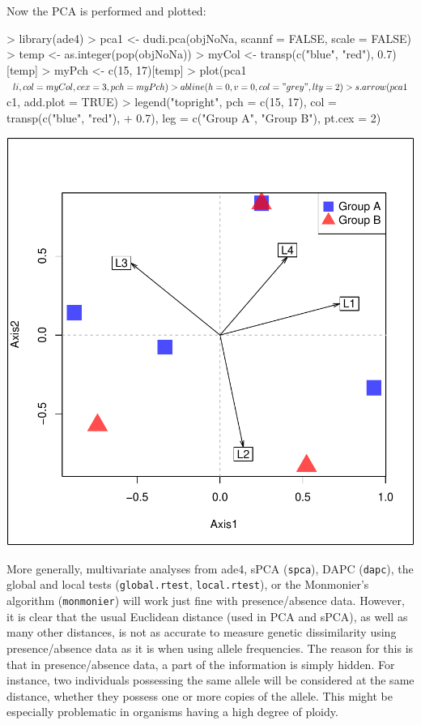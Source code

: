 \documentclass{article}
\begin{document}
\noindent Now the PCA is performed and plotted:
\begin{Schunk}
\begin{Sinput}
> library(ade4)
> pca1 <- dudi.pca(objNoNa, scannf = FALSE, scale = FALSE)
> temp <- as.integer(pop(objNoNa))
> myCol <- transp(c("blue", "red"), 0.7)[temp]
> myPch <- c(15, 17)[temp]
> plot(pca1$li, col = myCol, cex = 3, pch = myPch)
> abline(h = 0, v = 0, col = "grey", lty = 2)
> s.arrow(pca1$c1, add.plot = TRUE)
> legend("topright", pch = c(15, 17), col = transp(c("blue", "red"), 
+     0.7), leg = c("Group A", "Group B"), pt.cex = 2)
\end{Sinput}
\end{Schunk}
\includegraphics{figs/base-pcaaflp}

\noindent More generally, multivariate analyses from ade4, sPCA (\texttt{spca}), DAPC
(\texttt{dapc}), the global and local tests (\texttt{global.rtest}, \texttt{local.rtest}), or
the Monmonier's algorithm (\texttt{monmonier}) will work just fine
with presence/absence data.
However, it is clear that the usual Euclidean distance (used in PCA
and sPCA), as well as many other distances, is not as accurate to measure genetic dissimilarity using
presence/absence data as it is when using allele frequencies.
The reason for this is that in presence/absence data, a part of the
information is simply hidden.
For instance, two individuals possessing the same allele will be
considered at the same distance, whether they possess one or more
copies of the allele.
This might be especially problematic in organisms having a high degree
of ploidy.
\end{document}
